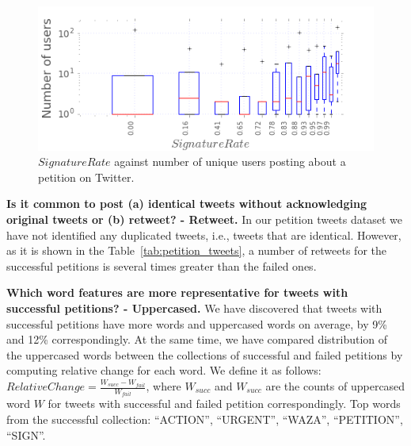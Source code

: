 \begin{figure}
\centering
\includegraphics[scale=0.45]{figures/signaturesgoalVSnumusersCampaigns.png}
\caption{$SignatureRate$ against number of unique users posting about a petition on Twitter.}
\label{fig:signatures_vs_users}
\end{figure}

\textbf{Is it common to post (a) identical tweets without acknowledging original tweets or (b) retweet? - Retweet.} In our petition tweets dataset we have not identified any duplicated tweets, i.e., tweets that are identical. However, as it is shown in the Table~\ref{tab:petition_tweets}, a number of retweets for the successful petitions is several times greater than the failed ones.

\textbf{Which word features are more representative for tweets with successful petitions? - Uppercased.} We have discovered that tweets with successful petitions have more words and uppercased words on average, by 9\% and 12\% correspondingly. At the same time, we have compared distribution of the uppercased words between the collections of successful and failed petitions by computing relative change for each word. We define it as follows: $RelativeChange = \frac{W_{succ} - W_{fail}}{W_{fail}}$, where $W_{succ}$ and $W_{succ}$ are the counts of uppercased word $W$ for tweets with successful and failed petition correspondingly. Top words from the successful collection: ``ACTION'', ``URGENT'', ``WAZA'', ``PETITION'', ``SIGN''.